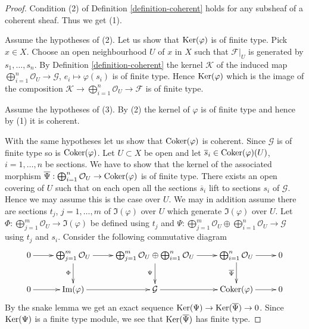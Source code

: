 \begin{proof}
Condition (2) of Definition \ref{definition-coherent}
holds for any subsheaf of a coherent sheaf. Thus we get (1).

\medskip\noindent
Assume the hypotheses of (2).
Let us show that $\mathop{\mathrm{Ker}}(\varphi)$ is of finite type. Pick $x \in X$.
Choose an open neighbourhood $U$ of $x$ in $X$ such
that $\mathcal{F}|_U$ is generated by $s_1, \ldots, s_n$.
By Definition \ref{definition-coherent} the kernel $\mathcal{K}$
of the induced map
$\bigoplus_{i = 1}^n \mathcal{O}_U \to \mathcal{G}$,
$e_i \mapsto \varphi(s_i)$ is of finite type.
Hence $\mathop{\mathrm{Ker}}(\varphi)$ which is the image of the
composition
$\mathcal{K} \to \bigoplus_{i = 1}^n \mathcal{O}_U \to \mathcal{F}$
is of finite type.

\medskip\noindent
Assume the hypotheses of (3).
By (2) the kernel of $\varphi$ is of finite type and
hence by (1) it is coherent.

\medskip\noindent
With the same hypotheses let us show that $\mathop{\mathrm{Coker}}(\varphi)$ is coherent.
Since $\mathcal{G}$ is of finite type so is $\mathop{\mathrm{Coker}}(\varphi)$.
Let $U \subset X$ be open and let $\overline{s}_i \in \mathop{\mathrm{Coker}}(\varphi)(U)$,
$i = 1, \ldots, n$ be sections. We have to show that the kernel of the
associated morphism
$\overline{\Psi} : \bigoplus_{i = 1}^n \mathcal{O}_U \to \mathop{\mathrm{Coker}}(\varphi)$
is of finite type. There exists an open covering
of $U$ such that on each open all the sections $\overline{s}_i$
lift to sections $s_i$ of $\mathcal{G}$. Hence we may assume
this is the case over $U$. We may in addition assume there are
sections $t_j$, $j = 1, \ldots, m$ of $\Im(\varphi)$ over $U$
which generate $\Im(\varphi)$ over $U$.
Let $\Phi : \bigoplus_{j = 1}^m \mathcal{O}_U \to \Im(\varphi)$
be defined using $t_j$ and
$\Psi :
\bigoplus_{j = 1}^m \mathcal{O}_U \oplus
\bigoplus_{i = 1}^n \mathcal{O}_U \to \mathcal{G}$
using $t_j$ and $s_i$.
Consider the following commutative diagram
$$
\xymatrix{
0 \ar[r] &
\bigoplus_{j = 1}^m \mathcal{O}_U \ar[d]_\Phi \ar[r] &
\bigoplus_{j = 1}^m \mathcal{O}_U \oplus
\bigoplus_{i = 1}^n \mathcal{O}_U \ar[d]_\Psi \ar[r] &
\bigoplus_{i = 1}^n \mathcal{O}_U \ar[d]_{\overline{\Psi}} \ar[r] &
0 \\
0 \ar[r] &
\Im(\varphi) \ar[r] &
\mathcal{G} \ar[r] &
\Coker(\varphi) \ar[r] &
0
}
$$
By the snake lemma we get an exact sequence
$\mathop{\mathrm{Ker}}(\Psi) \to \mathop{\mathrm{Ker}}(\overline{\Psi}) \to 0$. Since $\mathop{\mathrm{Ker}}(\Psi)$
is a finite type module, we see that $\mathop{\mathrm{Ker}}(\overline{\Psi})$ has finite type.


\end{proof}
